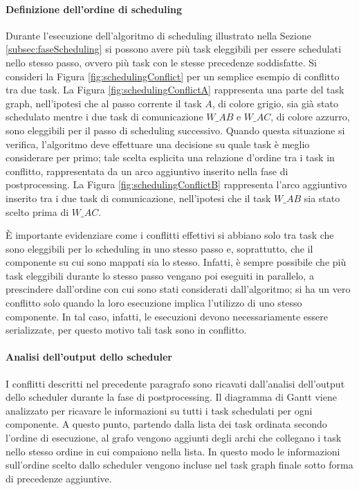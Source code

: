 \paragraph{Definizione dell'ordine di scheduling}
Durante l'esecuzione dell'algoritmo di scheduling illustrato nella Sezione 
\ref{subsec:faseScheduling} si possono avere più task eleggibili per essere 
schedulati nello stesso passo, ovvero più task con le stesse precedenze 
soddisfatte. Si consideri la Figura \ref{fig:schedulingConflict} per un 
semplice esempio di conflitto tra due task. La Figura 
\ref{fig:schedulingConflictA} rappresenta una parte del task graph, 
nell'ipotesi che al passo corrente il task $A$, di colore grigio, sia già stato 
schedulato mentre i due task di comunicazione $W\_AB$ e $W\_AC$, di colore 
azzurro, sono eleggibili per il passo di scheduling successivo. Quando questa
situazione si verifica, l'algoritmo deve effettuare una decisione su quale 
task è meglio considerare per primo; tale scelta esplicita una relazione 
d'ordine tra i task in conflitto, rappresentata da un arco aggiuntivo inserito 
nella fase di postprocessing. La Figura \ref{fig:schedulingConflictB} 
rappresenta l'arco aggiuntivo inserito tra i due task di comunicazione, 
nell'ipotesi che il task $W\_AB$ sia stato scelto prima di $W\_AC$.

È importante evidenziare come i conflitti effettivi si abbiano solo tra task 
che sono eleggibili per lo scheduling in uno stesso passo e, soprattutto, che 
il componente su cui sono mappati sia lo stesso. Infatti, è sempre possibile 
che più task eleggibili durante lo stesso passo vengano poi eseguiti in 
parallelo, a prescindere dall'ordine con cui sono stati considerati 
dall'algoritmo; si ha un vero conflitto solo quando la loro esecuzione implica 
l'utilizzo di uno stesso componente. In tal caso, infatti, le esecuzioni devono 
necessariamente essere serializzate, per questo motivo tali task sono in 
conflitto.

\paragraph{Analisi dell'output dello scheduler}
I conflitti descritti nel precedente paragrafo sono ricavati dall'analisi 
dell'output dello scheduler durante la fase di postprocessing. Il diagramma di 
Gantt viene analizzato per ricavare le informazioni su tutti i task schedulati 
per ogni componente. A questo punto, partendo dalla lista dei task ordinata 
secondo l'ordine di esecuzione, al grafo vengono aggiunti degli archi che 
collegano i task nello stesso ordine in cui compaiono nella lista. In questo 
modo le informazioni sull'ordine scelto dallo scheduler vengono incluse nel 
task graph finale sotto forma di precedenze aggiuntive.

